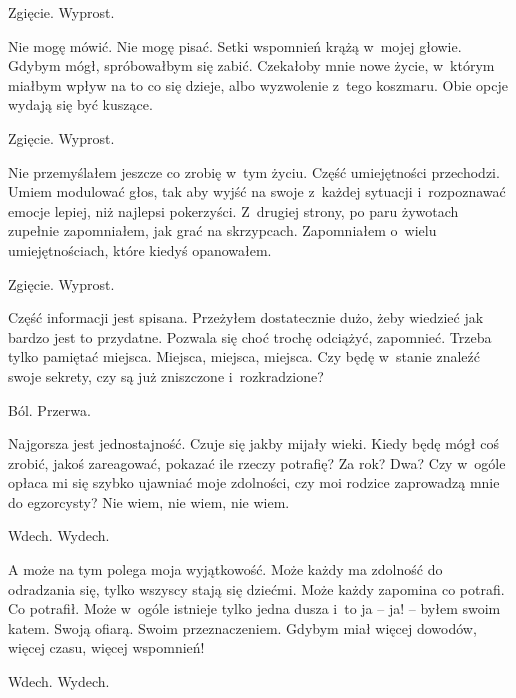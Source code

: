 \begin{itquote}
Zgięcie. Wyprost.
\end{itquote}

Nie mogę mówić. Nie mogę pisać. Setki wspomnień krążą w~mojej głowie. Gdybym mógł, spróbowałbym się zabić. Czekałoby mnie nowe życie, w~którym miałbym wpływ na to co się dzieje, albo wyzwolenie z~tego koszmaru. Obie opcje wydają się być kuszące.

\begin{itquote}
Zgięcie. Wyprost.
\end{itquote}

Nie przemyślałem jeszcze co zrobię w~tym życiu. Część umiejętności przechodzi. Umiem modulować głos, tak aby wyjść na swoje z~każdej sytuacji i~rozpoznawać emocje lepiej, niż najlepsi pokerzyści. Z~drugiej strony, po paru żywotach zupełnie zapomniałem, jak grać na skrzypcach. Zapomniałem o~wielu umiejętnościach, które kiedyś opanowałem.

\begin{itquote}
Zgięcie. Wyprost.
\end{itquote}

Część informacji jest spisana. Przeżyłem dostatecznie dużo, żeby wiedzieć jak bardzo jest to przydatne. Pozwala się choć trochę odciążyć, zapomnieć. Trzeba tylko pamiętać miejsca. Miejsca, miejsca, miejsca. Czy będę w~stanie znaleźć swoje sekrety, czy są już zniszczone i~rozkradzione?

\begin{itquote}
Ból. Przerwa.
\end{itquote}

Najgorsza jest jednostajność. Czuje się jakby mijały wieki. Kiedy będę mógł coś zrobić, jakoś zareagować, pokazać ile rzeczy potrafię? Za rok? Dwa? Czy w~ogóle opłaca mi się szybko ujawniać moje zdolności, czy moi rodzice zaprowadzą mnie do egzorcysty? Nie wiem, nie wiem, nie wiem.

\begin{itquote}
Wdech. Wydech.
\end{itquote}

A może na tym polega moja wyjątkowość. Może każdy ma zdolność do odradzania się, tylko wszyscy stają się dziećmi. Może każdy zapomina co potrafi. Co potrafił. Może w~ogóle istnieje tylko jedna dusza i~to ja -- ja! -- byłem swoim katem. Swoją ofiarą. Swoim przeznaczeniem. Gdybym miał więcej dowodów, więcej czasu, więcej wspomnień! 

\begin{itquote}
Wdech. Wydech.
\end{itquote}

